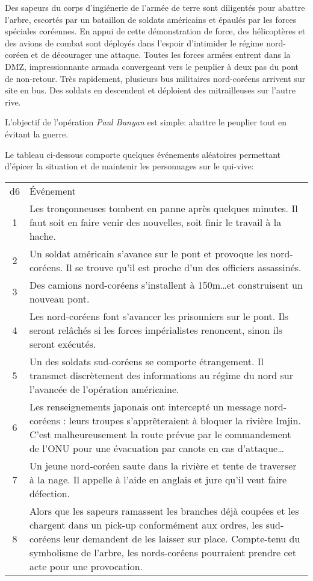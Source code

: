 Des sapeurs du corps d'ingiénerie de l'armée de terre sont diligentés pour abattre l'arbre, escortés par un bataillon de soldats américains et épaulés par les forces spéciales coréennes.
En appui de cette démonstration de force, des hélicoptères et des avions de combat sont déployés dans l'espoir d'intimider le régime nord-coréen et de décourager une attaque.
Toutes les forces armées entrent dans la DMZ, impressionnante armada convergeant vers le peuplier à deux pas du pont de non-retour.
Très rapidement, plusieurs bus militaires nord-coréens arrivent sur site en bus.
Des soldats en descendent et déploient des mitrailleuses sur l'autre rive.

L'objectif de l'opération \emph{Paul Bunyan} est simple: abattre le peuplier tout en évitant la guerre.

Le tableau ci-dessous comporte quelques événements aléatoires permettant d'épicer la situation et de maintenir les personnages sur le qui-vive:

\begin{table}
	\begin{tabularx}{0.8\textwidth}{cX}
	d6 & Événement\\
	1  & Les tronçonneuses tombent en panne après quelques minutes. Il faut soit en faire venir des nouvelles, soit finir le travail à la hache.\\
	2  & Un soldat américain s'avance sur le pont et provoque les nord-coréens. Il se trouve qu'il est proche d'un des officiers assassinés.\\
	3  & Des camions nord-coréens s'installent à 150m\dots et construisent un nouveau pont.\\
	4  & Les nord-coréens font s'avancer les prisonniers sur le pont. Ils seront relâchés si les forces impérialistes renoncent, sinon ils seront exécutés.\\
	5  & Un des soldats sud-coréens se comporte étrangement. Il transmet discrètement des informations au régime du nord sur l'avancée de l'opération américaine.\\
	6  & Les renseignements japonais ont intercepté un message nord-coréens : leurs troupes s'apprêteraient à bloquer la rivière Imjin. C'est malheureusement la route prévue par le commandement de l'ONU pour une évacuation par canots en cas d'attaque\dots\\
	7  & Un jeune nord-coréen saute dans la rivière et tente de traverser à la nage. Il appelle à l'aide en anglais et jure qu'il veut faire défection.\\
	8  & Alors que les sapeurs ramassent les branches déjà coupées et les chargent dans un pick-up conformément aux ordres, les sud-coréens leur demandent de les laisser sur place. Compte-tenu du symbolisme de l'arbre, les nords-coréens pourraient prendre cet acte pour une provocation.\\
	\end{tabularx}
\end{table}
